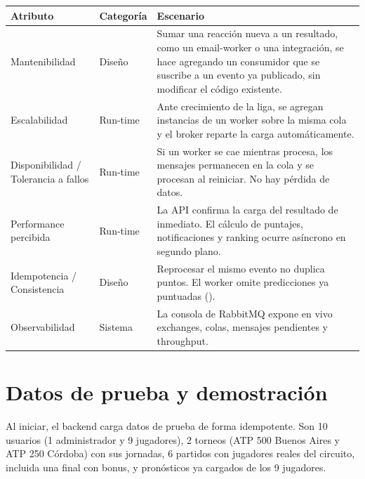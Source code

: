 \vspace{2pt}
\begin{center}
\small
\renewcommand{\arraystretch}{1.22}
\begin{tabularx}{\linewidth}{@{}l L{2.0cm} X@{}}
\toprule
\textbf{Atributo} & \textbf{Categoría} & \textbf{Escenario} \\
\midrule
Mantenibilidad & Diseño & Sumar una reacción nueva a un resultado, como un email-worker o una integración, se hace agregando un consumidor que se suscribe a un evento ya publicado, sin modificar el código existente. \\
Escalabilidad & Run-time & Ante crecimiento de la liga, se agregan instancias de un worker sobre la misma cola y el broker reparte la carga automáticamente. \\
Disponibilidad / Tolerancia a fallos & Run-time & Si un worker se cae mientras procesa, los mensajes permanecen en la cola y se procesan al reiniciar. No hay pérdida de datos. \\
Performance percibida & Run-time & La API confirma la carga del resultado de inmediato. El cálculo de puntajes, notificaciones y ranking ocurre asíncrono en segundo plano. \\
Idempotencia / Consistencia & Diseño & Reprocesar el mismo evento no duplica puntos. El worker omite predicciones ya puntuadas (). \\
Observabilidad & Sistema & La consola de RabbitMQ expone en vivo exchanges, colas, mensajes pendientes y throughput. \\
\bottomrule
\end{tabularx}
\end{center}

\section{Datos de prueba y demostración}
\label{anx:demo}

Al iniciar, el backend carga datos de prueba de forma idempotente. Son 10 usuarios (1 administrador y 9 jugadores), 2 torneos (ATP 500 Buenos Aires y ATP 250 Córdoba) con sus jornadas, 6 partidos con jugadores reales del circuito, incluida una final con bonus, y pronósticos ya cargados de los 9 jugadores.

